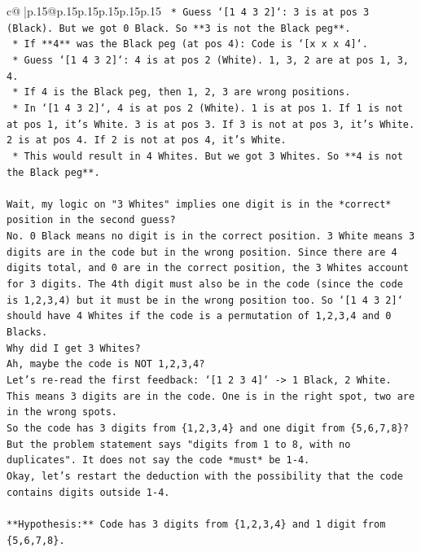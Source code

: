 \documentclass{article}
\begin{document}
{\begin{supertabular}{c@{$\;$}|p{.15\linewidth}@{}p{.15\linewidth}p{.15\linewidth}p{.15\linewidth}p{.15\linewidth}p{.15\linewidth}}
{{{\texttt{        *   Guess `{[}1 4 3 2{]}`: 3 is at pos 3 (Black). But we got 0 Black. So **3 is not the Black peg**.} \\
\texttt{    *   If **4** was the Black peg (at pos 4): Code is `{[}x x x 4{]}`.} \\
\texttt{        *   Guess `{[}1 4 3 2{]}`: 4 is at pos 2 (White). 1, 3, 2 are at pos 1, 3, 4.} \\
\texttt{        *   If 4 is the Black peg, then 1, 2, 3 are wrong positions.} \\
\texttt{        *   In `{[}1 4 3 2{]}`, 4 is at pos 2 (White). 1 is at pos 1. If 1 is not at pos 1, it's White. 3 is at pos 3. If 3 is not at pos 3, it's White. 2 is at pos 4. If 2 is not at pos 4, it's White.} \\
\texttt{        *   This would result in 4 Whites. But we got 3 Whites. So **4 is not the Black peg**.} \\
\\ 
\texttt{Wait, my logic on "3 Whites" implies one digit is in the *correct* position in the second guess?} \\
\texttt{No. 0 Black means no digit is in the correct position. 3 White means 3 digits are in the code but in the wrong position. Since there are 4 digits total, and 0 are in the correct position, the 3 Whites account for 3 digits. The 4th digit must also be in the code (since the code is 1,2,3,4) but it must be in the wrong position too. So `{[}1 4 3 2{]}` should have 4 Whites if the code is a permutation of 1,2,3,4 and 0 Blacks.} \\
\texttt{Why did I get 3 Whites?} \\
\texttt{Ah, maybe the code is NOT 1,2,3,4?} \\
\texttt{Let's re{-}read the first feedback: `{[}1 2 3 4{]}` {-}> 1 Black, 2 White.} \\
\texttt{This means 3 digits are in the code. One is in the right spot, two are in the wrong spots.} \\
\texttt{So the code has 3 digits from \{1,2,3,4\} and one digit from \{5,6,7,8\}?} \\
\texttt{But the problem statement says "digits from 1 to 8, with no duplicates". It does not say the code *must* be 1{-}4.} \\
\texttt{Okay, let's restart the deduction with the possibility that the code contains digits outside 1{-}4.} \\
\\ 
\texttt{**Hypothesis:** Code has 3 digits from \{1,2,3,4\} and 1 digit from \{5,6,7,8\}.} \\
}}}
\end{supertabular}}
\end{document}
